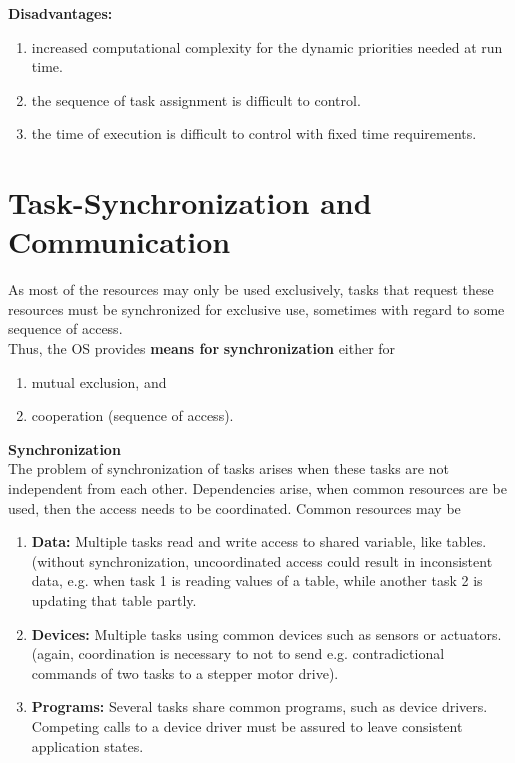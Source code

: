 \textbf{Disadvantages:}

\begin{enumerate}
\item \textbf{ }increased computational complexity for the dynamic priorities needed at run time.

\item  the sequence of task assignment is difficult to control.

\item  the time of execution is difficult to control with fixed time requirements.
\end{enumerate}
\newpage

\section{Task-Synchronization and Communication}

As most of the resources may only be used exclusively, tasks that request these resources must be synchronized for exclusive use, sometimes with regard to some sequence of access. \\

Thus, the OS provides \textbf{means for} \textbf{synchronization} either for 

\begin{enumerate}
\item  mutual exclusion, and 
\item  cooperation (sequence of access).
\end{enumerate}

{\rot\bf Synchronization }\\

The problem of synchronization of tasks arises when these tasks are not independent from each other. Dependencies arise, when common resources are be used, then the access needs to be coordinated. Common resources may be

\begin{enumerate}
	\item  \textbf{Data: }Multiple tasks read and write access to shared variable, like tables. (without synchronization, uncoordinated access could result in inconsistent data, e.g. when task 1 is reading values of a table, while another task 2 is updating that table partly.

	\item  \textbf{Devices: } Multiple tasks using common devices such as sensors or actuators. (again, coordination is necessary to not to send e.g. contradictional commands of two tasks to a stepper motor drive).

	\item  \textbf{Programs: } Several tasks share common programs, such as device drivers. Competing calls to a device driver must be assured to leave consistent application states.
\end{enumerate}

